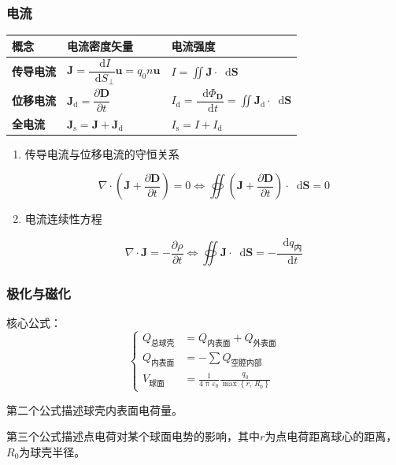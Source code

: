 \documentclass[UTF8,fontset=fandol,zihao=5]{ctexart}
\newcommand{\vect}[1]{\bm{#1}}
\newcommand{\dif}{\mathop{}\!\mathrm{d}}
\begin{document}
\subsubsection{电流}

\begin{center}
\begin{tabularx}{0.98\textwidth}{>{\bfseries}p{1.5cm}X X}
\toprule
概念 & 电流密度矢量 & 电流强度 \\
\midrule
传导电流 & $\vect J=\dfrac{\dif I}{\dif S_{\perp}} \hat{\vect u}=q_0 n \vect u$ & $ \displaystyle I = \iint \vect J \cdot \dif \vect S $ \\[6pt]
位移电流 & $\vect J_{\mathrm d} = \dfrac{\partial \vect D}{\partial t}$ & $ \displaystyle I_{\mathrm d} = \dfrac{\dif \varPhi_{\vect D}}{\dif t} =  \iint \vect J_{\mathrm d} \cdot \dif \vect S $ \\[6pt]
全电流 & $\vect J_{\mathrm s} = \vect J + \vect J_{\mathrm d} $ & $ I_{\mathrm s} = I + I_{\mathrm d} $ \\
\bottomrule
\end{tabularx}
\end{center}

\begin{enumerate}
  \item 传导电流与位移电流的守恒关系
  
  \[
  \nabla\cdot\left(\vect J + \dfrac{\partial \vect D}{\partial t}\right) = 0 \Leftrightarrow \oiint \left(\vect J + \dfrac{\partial \vect D}{\partial t}\right) \cdot \dif \vect S = 0
  \]
  
  \item 电流连续性方程
  
  \[
  \nabla\cdot\vect J = -\frac{\partial \rho}{\partial t}\Leftrightarrow \oiint \vect J\cdot\dif\vect S=-\frac{\dif q_\text{内}}{\dif t}
  \]
\end{enumerate}


\subsubsection{极化与磁化}

\begin{methodbox}[球壳表面电荷求法]
  核心公式：
  \[
  \left\{\begin{aligned}
    Q_{\text{总球壳}} &= Q_{\text{内表面}} + Q_{\text{外表面}} \\
    Q_{\text{内表面}} &= -\sum Q_{\text{空腔内部}} \\
    V_{\text{球面}} &= \frac{1}{4\uppi\varepsilon_0}\frac{q_0}{\max\left\{r,\,R_0\right\}} 
  \end{aligned}\right.
  \]

  第二个公式描述球壳内表面电荷量。

  第三个公式描述点电荷对某个球面电势的影响，其中$r$为点电荷距离球心的距离，$R_0$为球壳半径。
\end{methodbox}
\end{document}
